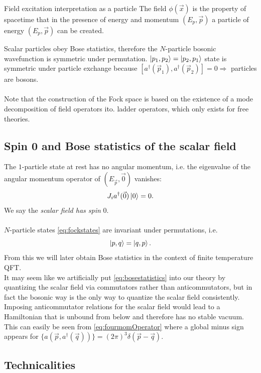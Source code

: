 \begin{mybox}{Field excitation interpretation as a particle}
	The field $\phi(\vec{x})$ is the property of spacetime that in the presence of energy and momentum $(E_p,\vec{p})$ a particle of energy $(E_p, \vec{p})$ can be created.
\end{mybox}
Scalar particles obey Bose statistics, therefore the $N$-particle bosonic wavefunction is symmetric under permutation.
$\ket{p_1,p_2}=\ket{p_2,p_1}$ state is symmetric under particle exchange because $\left[a^{\dagger}(\vec{p}_1), a^{\dagger}(\vec{p}_2)\right]=0 \Rightarrow$ particles are bosons.
\\
\\
Note that the construction of the Fock space is based on the existence of a mode decomposition of field operators ito. ladder operators, which only exists for free theories.
\subsection{Spin 0 and Bose statistics of the scalar field}
The $1$-particle state at rest has no angular momentum, i.e. the eigenvalue of the angular momentum operator of $(E_{\vec{p}},\vec{0})$ vanishes:
\begin{equation}
	J_i a^\dagger(\vec{0}) \ket{0} = 0.
\end{equation}
We say the \emph{scalar field has spin} $0$.\\
\\
$N$-particle states \ref{eq:fockstates} are invariant under permutations, i.e.
\begin{equation}
\label{eq:bosestatistics}
	\ket{p,q} = \ket{q,p}.
\end{equation}
From this we will later obtain Bose statistics in the context of finite temperature QFT.\\
It may seem like we artificially put \ref{eq:bosestatistics} into our theory by quantizing the scalar field via commutators rather than anticommutators, but in fact the bosonic way is the only way to quantize the scalar field consistently. Imposing anticommutator relations for the scalar field would lead to a Hamiltonian that is unbound from below and therefore has no stable vacuum. This can easily be seen from \ref{eq:fourmomOperator} where a global minus sign appears for $\{a(\vec{p},a^\dagger(\vec{q}))\} =(2\pi)^3 \delta(\vec{p}-\vec{q})$.
\subsection{Technicalities}
